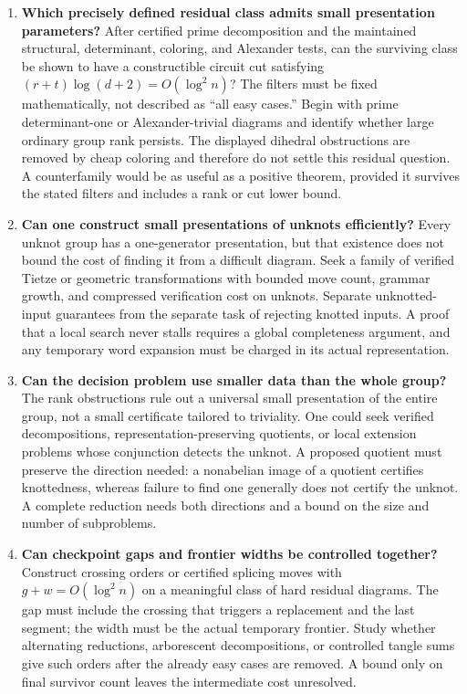 \begin{enumerate}[label=\textbf{Q\arabic*.},leftmargin=3em]
\item \textbf{Which precisely defined residual class admits small
presentation parameters?}
After certified prime decomposition and the maintained structural,
determinant, coloring, and Alexander tests, can the surviving class be
shown to have a constructible circuit cut satisfying
$(r+t)\log(d+2)=O(\log^2 n)$? The filters must be fixed mathematically,
not described as ``all easy cases.'' Begin with prime determinant-one or
Alexander-trivial diagrams and identify whether large ordinary group
rank persists. The displayed dihedral obstructions are removed by cheap
coloring and therefore do not settle this residual question. A counterfamily
would be as useful as a positive theorem, provided it survives the stated
filters and includes a rank or cut lower bound.

\item \textbf{Can one construct small presentations of unknots efficiently?}
Every unknot group has a one-generator presentation, but that existence
does not bound the cost of finding it from a difficult diagram. Seek a
family of verified Tietze or geometric transformations with bounded move
count, grammar growth, and compressed verification cost on unknots.
Separate unknotted-input guarantees from the separate task of rejecting
knotted inputs. A proof that a local search never stalls requires a
global completeness argument, and any temporary word expansion must be
charged in its actual representation.

\item \textbf{Can the decision problem use smaller data than the whole group?}
The rank obstructions rule out a universal small presentation of the
entire group, not a small certificate tailored to triviality. One could
seek verified decompositions, representation-preserving quotients, or
local extension problems whose conjunction detects the unknot. A proposed
quotient must preserve the direction needed: a nonabelian image of a
quotient certifies knottedness, whereas failure to find one generally
does not certify the unknot. A complete reduction needs both directions
and a bound on the size and number of subproblems.

\item \textbf{Can checkpoint gaps and frontier widths be controlled together?}
Construct crossing orders or certified splicing moves with
$g+w=O(\log^2 n)$ on a meaningful class of hard residual diagrams.
The gap must include the crossing that triggers a replacement and the
last segment; the width must be the actual temporary frontier. Study
whether alternating reductions, arborescent decompositions, or controlled
tangle sums give such orders after the already easy cases are removed.
A bound only on final survivor count leaves the intermediate cost unresolved.


\end{enumerate}

